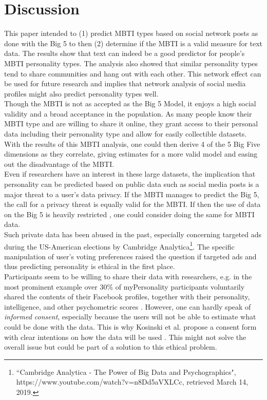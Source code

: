 \section{Discussion}
\label{sec:discussion}
This paper intended to (1) predict MBTI types based on social network posts as done with the Big 5 to then (2) determine if the MBTI is a valid measure for text data. The results show that text can indeed be a good predictor for people's MBTI personality types.
The analysis also showed that similar personality types tend to share communities and hang out with each other. This network effect can be used for future research and implies that network analysis of social media profiles might also predict personality types well.\\
Though the MBTI is not as accepted as the Big 5 Model, it enjoys a high social validity and a broad acceptance in the population. As many people know their MBTI type and are willing to share it online, they grant access to their personal data including their personality type and allow for easily collectible datasets. With the results of this MBTI analysis, one could then derive 4 of the 5 Big Five dimensions as they correlate, giving estimates for a more valid model and easing out the disadvantage of the MBTI.\\
Even if researchers have an interest in these large datasets, the implication that personality can be predicted based on public data such as social media posts is a major threat to a user's data privacy. If the MBTI manages to predict the Big 5, the call for a privacy threat is equally valid for the MBTI. If then the use of data on the Big 5 is heavily restricted \cite{kosinski_facebook_2015}, one could consider doing the same for MBTI data.\\
Such private data has been abused in the past, especially concerning targeted ads during the US-American elections by Cambridge Analytica\cite{krogerus_ich_2018}\footnote{``Cambridge Analytica - The Power of Big Data and Psychographics", https://www.youtube.com/watch?v=n8Dd5aVXLCc, retrieved March 14, 2019.}. The specific manipulation of user's voting preferences raised the question if targeted ads and thus predicting personality is ethical in the first place.\\
Participants seem to be willing to share their data with researchers, e.g. in the most prominent example over 30\% of myPersonality participants voluntarily shared the contents of their Facebook profiles, together with their personality, intelligence, and other psychometric scores \cite{stillwell_mypersonality_2018}. However, one can hardly speak of \textit{informed consent}\cite{fleming_telehealth_2009}, especially because the users will not be able to estimate what could be done with the data. This is why Kosinski et al. propose a consent form with clear intentions on how the data will be used \cite{kosinski_facebook_2015}. This might not solve the overall issue but could be part of a solution to this ethical problem.

